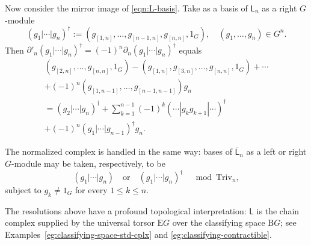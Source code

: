 Now consider the mirror image of \eqref{eqn:L-basis}. Take as a basis of
$\mathsf{L}_n$ as a right $G$-module
\begin{equation}\label{eqn:L-basis-right}
	(g_1 | \cdots | g_n)^\dagger := \left( g_{[1, n]}, \ldots, g_{[n-1, n]} , g_{[n, n]}, 1_G \right), \quad (g_1, \ldots, g_n) \in G^n.
\end{equation}
Then
$\partial'_n(g_1|\cdots|g_n)^\dagger=
(-1)^n\partial_n(g_1|\cdots|g_n)^\dagger$ equals
\begin{multline}\label{eqn:L-basis-partial-right}
	\left( g_{[2, n]}, \ldots, g_{[n, n]}, 1_G \right) - \left( g_{[1, n]}, g_{[3, n]}, \ldots, g_{[n, n]}, 1_G \right) + \cdots \\
	+ (-1)^n \left( g_{[1, n-1]}, \ldots, g_{[n-1, n-1]} \right) g_n  \\
	= (g_2 | \cdots | g_n)^\dagger + \sum_{k=1}^{n-1} (-1)^k (\cdots | g_k g_{k+1} | \cdots)^\dagger \\
	+ (-1)^n (g_1 | \cdots | g_{n-1})^\dagger g_n.
\end{multline}

The normalized complex is handled in the same way: bases of
$\overline{\mathsf{L}}_n$ as a left or right $G$-module may be taken,
respectively, to be
\begin{equation}\label{eqn:nor-cochain}
	(g_1| \cdots | g_n) \quad \text{or} \quad (g_1 | \cdots | g_n)^\dagger \quad \bmod \mathrm{Triv}_n,
\end{equation}
subject to $g_k\neq1_G$ for every $1\leq k\leq n$.

\begin{remark}
	The resolutions above have a profound topological interpretation:
	$\mathsf{L}$ is the chain complex supplied by the universal torsor
	$\mathrm{E}G$ over the classifying space $\mathrm{B}G$; see
	Examples~\ref{eg:classifying-space-std-cplx} and
	\ref{eg:classifying-contractible}.
\end{remark}
